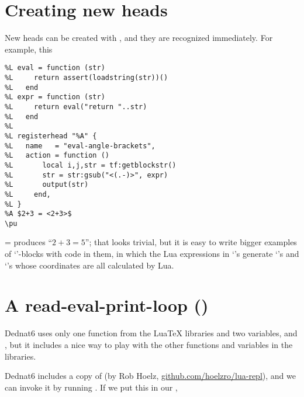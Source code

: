 \documentclass{ltugboat}
\begin{document}
\section{Creating new heads}

New heads can be created with , and they are
recognized immediately. For example, this

\begin{verbatim}
%L eval = function (str)
%L     return assert(loadstring(str))()
%L   end
%L expr = function (str)
%L     return eval("return "..str)
%L   end
%L
%L registerhead "%A" {
%L   name   = "eval-angle-brackets",
%L   action = function ()
%L       local i,j,str = tf:getblockstr()
%L       str = str:gsub("<(.-)>", expr)
%L       output(str)
%L     end,
%L }
%A $2+3 = <2+3>$
\pu
\end{verbatim}
%
=\hbox{\pu}   %
%
produces ``$2+3=5$''; that looks trivial, but it is easy to write
bigger examples of `'-blocks with  code in them, in
which the Lua expressions in `'s generate
`\co{\\polyline}'s and `\co{\\puts}'s whose coordinates are all
calculated by Lua.












%                          
\section{A read-eval-print-loop ()}


Dednat6 uses only one function from the Lua\TeX{} libraries \Dash
{} \Dash and two variables, \allowbreak{} and
, but it includes a nice way to play with the
other functions and variables in the libraries.

Dednat6 includes a copy of  (by Rob Hoelz,
\url{github.com/hoelzro/lua-repl}), and we can
invoke it by running . If we put this in our ,
{\hfuzz=1.5pt\par}
\end{document}
